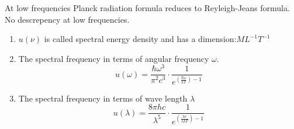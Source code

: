   At low frequencies Planck radiation formula reduces to Reyleigh-Jeans formula. No descrepency at low  frequencies.
  \begin{note}
  	\begin{enumerate}
  		\item $u(\nu)$ is called spectral energy density and has a dimension:\quad $M L^{-1} T^{-1}$
  		\item The spectral frequency in terms of angular frequency $\omega$.\\
  		$$u(\omega)=\frac{\hbar \omega^{3}}{\pi^{2} c^{3}} \cdot \frac{1}{e^{\left(\frac{\hbar \omega}{k T}\right)-1}} $$
  		\item The spectral frequency in terms of wave length $\lambda$
  		$$ u(\lambda)=\frac{8 \pi h c}{\lambda^{5}} \cdot \frac{1}{e^ {\left(\frac{h c}{\lambda k T}\right)-1}}$$
  	\end{enumerate}
  \end{note}
